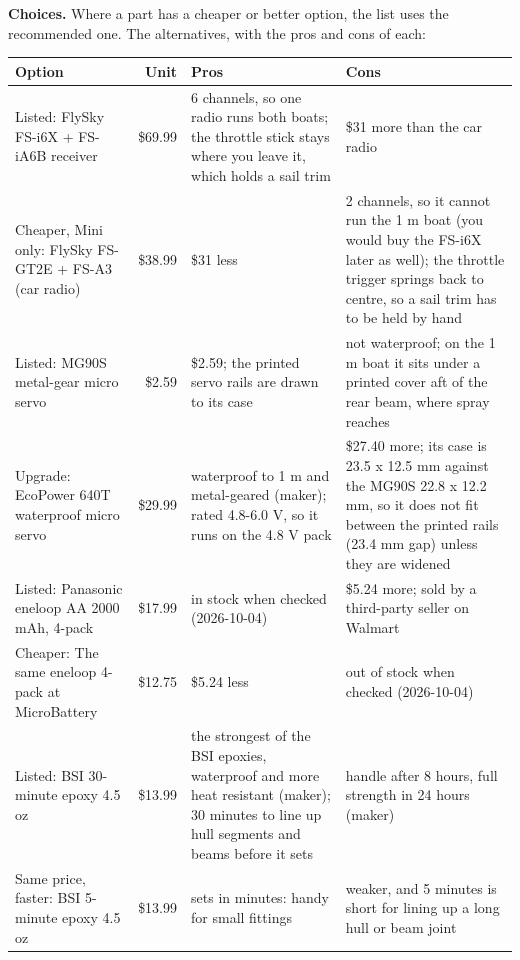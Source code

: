 \documentclass[11pt]{article}
\begin{document}
\noindent\textbf{Choices.} Where a part has a cheaper or better option, the list uses the recommended one. The alternatives, with the pros and cons of each:
{\small
\begin{longtable}{p{3.6cm}rp{5.2cm}p{5.2cm}}
\toprule
Option & Unit & Pros & Cons \\
\midrule\endhead
Listed: FlySky FS-i6X + FS-iA6B receiver & \$69.99 & 6 channels, so one radio runs both boats; the throttle stick stays where you leave it, which holds a sail trim & \$31 more than the car radio \\
Cheaper, Mini only: FlySky FS-GT2E + FS-A3 (car radio) & \$38.99 & \$31 less & 2 channels, so it cannot run the 1 m boat (you would buy the FS-i6X later as well); the throttle trigger springs back to centre, so a sail trim has to be held by hand \\
\midrule
Listed: MG90S metal-gear micro servo & \$2.59 & \$2.59; the printed servo rails are drawn to its case & not waterproof; on the 1 m boat it sits under a printed cover aft of the rear beam, where spray reaches \\
Upgrade: EcoPower 640T waterproof micro servo & \$29.99 & waterproof to 1 m and metal-geared (maker); rated 4.8-6.0 V, so it runs on the 4.8 V pack & \$27.40 more; its case is 23.5 x 12.5 mm against the MG90S 22.8 x 12.2 mm, so it does not fit between the printed rails (23.4 mm gap) unless they are widened \\
\midrule
Listed: Panasonic eneloop AA 2000 mAh, 4-pack & \$17.99 & in stock when checked (2026-10-04) & \$5.24 more; sold by a third-party seller on Walmart \\
Cheaper: The same eneloop 4-pack at MicroBattery & \$12.75 & \$5.24 less & out of stock when checked (2026-10-04) \\
\midrule
Listed: BSI 30-minute epoxy 4.5 oz & \$13.99 & the strongest of the BSI epoxies, waterproof and more heat resistant (maker); 30 minutes to line up hull segments and beams before it sets & handle after 8 hours, full strength in 24 hours (maker) \\
Same price, faster: BSI 5-minute epoxy 4.5 oz & \$13.99 & sets in minutes: handy for small fittings & weaker, and 5 minutes is short for lining up a long hull or beam joint \\
\bottomrule
\end{longtable}}
\end{document}
